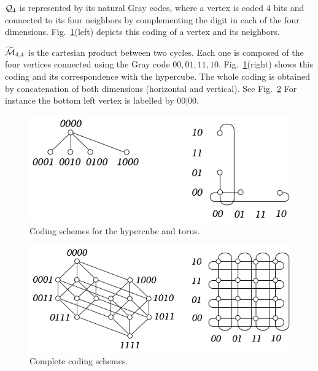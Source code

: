 \begin{itemize}
%

$\mbox{$\cal Q$}_4$ is represented by its natural Gray codes,
where a vertex is coded 4 bits and connected to its four neighbors by complementing 
the digit in each of the four dimensions.
Fig.~\ref{fig:IsomorphismCodingPrinciple}(left) depicts this coding of a vertex and its neighbors.
\medskip

$\widetilde{\mbox{$\cal M$}}_{4,4}$ is the cartesian product between two cycles.
Each one is composed of the four vertices connected using the Gray code
$00, 01, 11, 10$.
Fig.~\ref{fig:IsomorphismCodingPrinciple}(right) shows this coding and 
its correspondence with the hypercube. 
The whole coding is obtained by concatenation of both dimensions (horizontal and vertical).
See Fig.~\ref{fig:IsomorphismCodingComplete}
For instance the bottom left vertex is labelled by $00 | 00$. 
\medskip
 \begin{figure}[hbt]
\begin{center}
       \includegraphics[scale=0.45]{FiguresGraph/IsomorphismEx2}
       \caption{Coding schemes for the hypercube and torus.}
  \label{fig:IsomorphismCodingPrinciple}
\end{center}
\end{figure}
 \begin{figure}[hbt]
\begin{center}
       \includegraphics[scale=0.45]{FiguresGraph/IsomorphismEx1}
       \caption{Complete coding schemes.}
  \label{fig:IsomorphismCodingComplete}
\end{center}
\end{figure}


\end{itemize}

